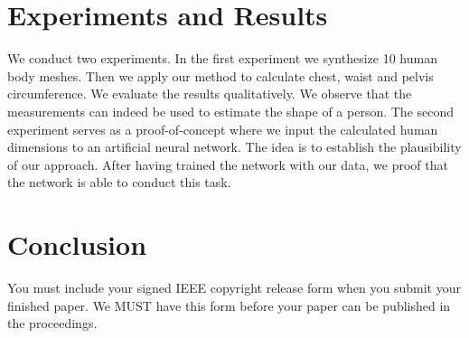 \documentclass[10pt,twocolumn,letterpaper]{article}
\begin{document}
 

\section{Experiments and Results}

We conduct two experiments. In the first experiment we synthesize 10 human body 
meshes. Then we apply our method to calculate chest, waist and pelvis 
circumference. We evaluate the results qualitatively. We observe that the 
measurements can indeed be used to estimate the shape of a person. The second 
experiment serves as a proof-of-concept where we input the calculated human 
dimensions to an artificial neural network. The idea is to establish the 
plausibility of our approach. After having trained the network with our data, 
we proof that the network is able to conduct this task.


\section{Conclusion}

You must include your signed IEEE copyright release form when you submit
your finished paper. We MUST have this form before your paper can be
published in the proceedings.

{\small


}
\end{document}
